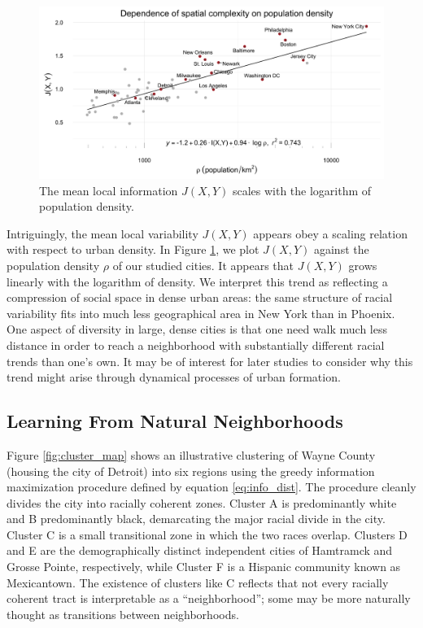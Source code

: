 	
	\begin{figure}
		\includegraphics[width=1\textwidth]{figs/density_fisher.png}
		\caption{The mean local information $J(X,Y)$ scales with the logarithm of population density.}
		\label{fig:density}
	\end{figure}	

	Intriguingly, the mean local variability $J(X,Y)$ appears obey a scaling relation with respect to urban density. In Figure \ref{fig:density}, we plot $J(X,Y)$ against the population density $\rho$ of our studied cities. It appears that $J(X,Y)$ grows linearly with the logarithm of density. We interpret this trend as reflecting a compression of social space in dense urban areas: the same structure of racial variability fits into much less geographical area in New York than in Phoenix. One aspect of diversity in large, dense cities is that one need walk much less distance in order to reach a neighborhood with substantially different racial trends than one's own. It may be of interest for later studies to consider why this trend might arise through dynamical processes of urban formation. 
	 
		

\subsection*{Learning From Natural Neighborhoods}

	Figure \ref{fig:cluster_map} shows an illustrative clustering of Wayne County (housing the city of Detroit) into six regions using the greedy information maximization procedure defined by equation \eqref{eq:info_dist}. The procedure cleanly divides the city into racially coherent zones. Cluster A is predominantly white and B predominantly black, demarcating the major racial divide in the city. Cluster C is a small transitional zone in which the two races overlap. Clusters D and E are the demographically distinct independent cities of Hamtramck and Grosse Pointe, respectively, while Cluster F is a Hispanic community known as Mexicantown. The existence of clusters like C reflects that not every racially coherent tract is interpretable as a ``neighborhood''; some may be more naturally thought as transitions between neighborhoods. 
	
